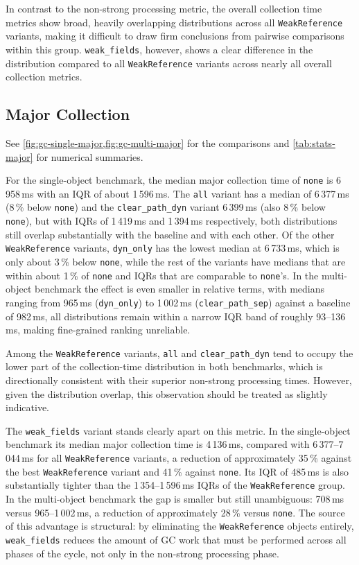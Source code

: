 In contrast to the non-strong processing metric, the overall collection time metrics show broad, heavily overlapping distributions across all \texttt{WeakReference} variants, making it difficult to draw firm conclusions from pairwise comparisons within this group. \texttt{weak\_fields}, however, shows a clear difference in the distribution compared to all \texttt{WeakReference} variants across nearly all overall collection metrics.

\subsection{Major Collection}
\label{subsec:analysis-overall-weakref}

See \cref{fig:gc-single-major,fig:gc-multi-major} for the comparisons and \cref{tab:stats-major} for numerical summaries.

For the single-object benchmark, the median major collection time of \texttt{none} is 6\,958\,ms with an \ac{IQR} of about 1\,596\,ms. The \texttt{all} variant has a median of 6\,377\,ms (8\,\% below \texttt{none}) and the \texttt{clear\_path\_dyn} variant 6\,399\,ms (also 8\,\% below \texttt{none}), but with \acp{IQR} of 1\,419\,ms and 1\,394\,ms respectively, both distributions still overlap substantially with the baseline and with each other. Of the other \texttt{WeakReference} variants, \texttt{dyn\_only} has the lowest median at 6\,733\,ms, which is only about 3\,\% below \texttt{none}, while the rest of the variants have medians that are within about 1\,\% of \texttt{none} and \acp{IQR} that are comparable to \texttt{none}'s. In the multi-object benchmark the effect is even smaller in relative terms, with medians ranging from 965\,ms (\texttt{dyn\_only}) to 1\,002\,ms (\texttt{clear\_path\_sep}) against a baseline of 982\,ms, all distributions remain within a narrow \ac{IQR} band of roughly 93--136\,ms, making fine-grained ranking unreliable.

Among the \texttt{WeakReference} variants, \texttt{all} and \texttt{clear\_path\_dyn} tend to occupy the lower part of the collection-time distribution in both benchmarks, which is directionally consistent with their superior non-strong processing times. However, given the distribution overlap, this observation should be treated as slightly indicative.

The \texttt{weak\_fields} variant stands clearly apart on this metric. In the single-object benchmark its median major collection time is 4\,136\,ms, compared with 6\,377--7\,044\,ms for all \texttt{WeakReference} variants, a reduction of approximately 35\,\% against the best \texttt{WeakReference} variant and 41\,\% against \texttt{none}. Its IQR of 485\,ms is also substantially tighter than the 1\,354--1\,596\,ms \acp{IQR} of the \texttt{WeakReference} group. In the multi-object benchmark the gap is smaller but still unambiguous: 708\,ms versus 965--1\,002\,ms, a reduction of approximately 28\,\% versus \texttt{none}. The source of this advantage is structural: by eliminating the \texttt{WeakReference} objects entirely, \texttt{weak\_fields} reduces the amount of \ac{GC} work that must be performed across all phases of the cycle, not only in the non-strong processing phase.

